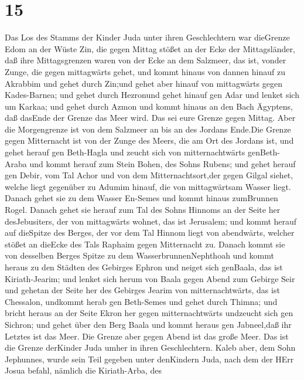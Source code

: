 \hypertarget{section-14}{%
\section{15}\label{section-14}}

 Das Los des Stamms der Kinder Juda unter ihren
Geschlechtern war dieGrenze Edom an der Wüste Zin, die gegen Mittag
stößet an der Ecke der Mittagsländer,  daß ihre
Mittagsgrenzen waren von der Ecke an dem Salzmeer, das ist, vonder
Zunge, die gegen mittagwärts gehet,  und kommt hinaus von
dannen hinauf zu Akrabbim und gehet durch Zin;und gehet aber hinauf von
mittagwärts gegen Kades-Barnea; und gehet durch Hezronund gehet hinauf
gen Adar und lenket sich um Karkaa;  und gehet durch Azmon
und kommt hinaus an den Bach Ägyptens, daß dasEnde der Grenze das Meer
wird. Das sei eure Grenze gegen Mittag.  Aber die
Morgengrenze ist von dem Salzmeer an bis an des Jordans Ende.Die Grenze
gegen Mitternacht ist von der Zunge des Meers, die am Ort des Jordans
ist,  und gehet herauf gen Beth-Hagla und zeucht sich von
mitternachtwärts genBeth-Araba und kommt herauf zum Stein Bohen, des
Sohns Rubens;  und gehet herauf gen Debir, vom Tal Achor und
von dem Mitternachtsort,der gegen Gilgal siehet, welche liegt gegenüber
zu Adumim hinauf, die von mittagwärtsam Wasser liegt. Danach gehet sie
zu dem Wasser En-Semes und kommt hinaus zumBrunnen Rogel. 
Danach gehet sie herauf zum Tal des Sohns Hinnoms an der Seite her
desJebusiters, der von mittagwärts wohnet, das ist Jerusalem; und kommt
herauf auf dieSpitze des Berges, der vor dem Tal Hinnom liegt von
abendwärts, welcher stößet an dieEcke des Tals Raphaim gegen Mitternacht
zu.  Danach kommt sie von desselben Berges Spitze zu dem
WasserbrunnenNephthoah und kommt heraus zu den Städten des Gebirges
Ephron und neiget sich genBaala, das ist Kiriath-Jearim; 
und lenket sich herum von Baala gegen Abend zum Gebirge Seir und gehetan
der Seite her des Gebirges Jearim von mitternachtwärts, das ist
Chessalon, undkommt herab gen Beth-Semes und gehet durch Thimna;
 und bricht heraus an der Seite Ekron her gegen
mitternachtwärts undzeucht sich gen Sichron; und gehet über den Berg
Baala und kommt heraus gen Jabneel,daß ihr Letztes ist das Meer.
 Die Grenze aber gegen Abend ist das große Meer. Das ist
die Grenze derKinder Juda umher in ihren Geschlechtern. 
Kaleb aber, dem Sohn Jephunnes, wurde sein Teil gegeben unter denKindern
Juda, nach dem der HErr Josua befahl, nämlich die Kiriath-Arba, des
